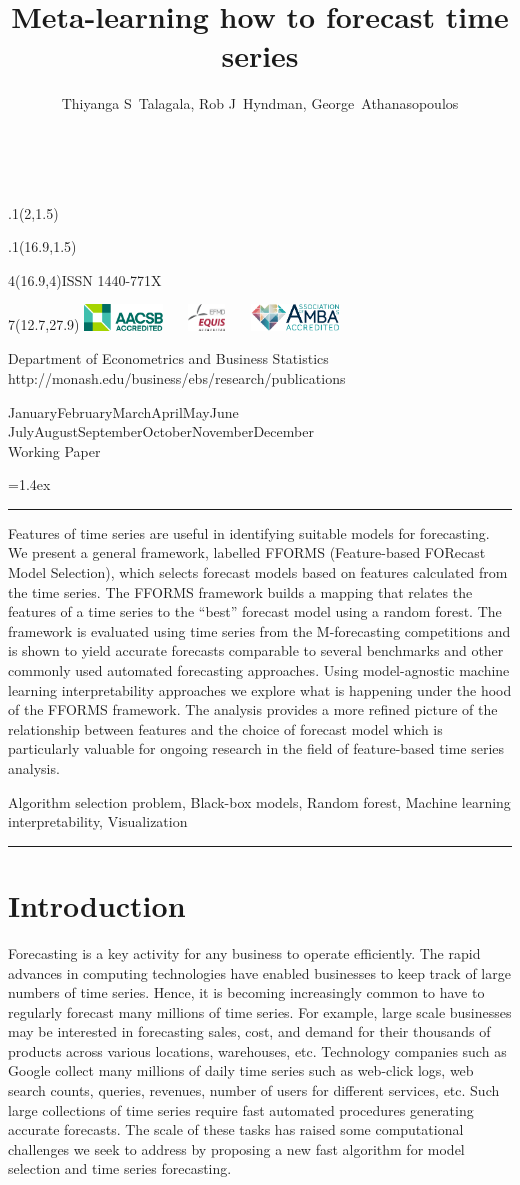 \documentclass[11pt,a4paper,]{article}
\title{Meta-learning how to forecast time series}
\author{Thiyanga S~Talagala, Rob J~Hyndman, George~Athanasopoulos}
\date{\sf\Date~\Month~\Year}
\makeatletter
\def\Date{\number\day}
\def\Month{\ifcase\month\or
 January\or February\or March\or April\or May\or June\or
 July\or August\or September\or October\or November\or December\fi}
\def\Year{\number\year}
\def\showjel{{\large\textsf{\textbf{JEL classification:}}~\@jel}}
\def\cover{{\sffamily\setcounter{page}{0}
        \thispagestyle{empty}
        \placefig{2}{1.5}{width=5cm}{monash2}
        \placefig{16.9}{1.5}{width=2.1cm}{MBusSchool}
        \begin{textblock}{4}(16.9,4)ISSN 1440-771X\end{textblock}
        \begin{textblock}{7}(12.7,27.9)\hfill
        \includegraphics[height=0.7cm]{AACSB}~~~
        \includegraphics[height=0.7cm]{EQUIS}~~~
        \includegraphics[height=0.7cm]{AMBA}
        \end{textblock}
        \vspace*{2cm}
        \begin{center}\Large
        Department of Econometrics and Business Statistics\\[.5cm]
        \footnotesize http://monash.edu/business/ebs/research/publications
        \end{center}\vspace{2cm}
        \begin{center}
        \fbox{\parbox{14cm}{\begin{onehalfspace}\centering\Huge\vspace*{0.3cm}
                \textsf{\textbf{\expandafter{\@title}}}\vspace{1cm}\par
                \LARGE\@author\end{onehalfspace}
        }}
        \end{center}
        \vfill
                \begin{center}\Large
                \Month~\Year\\[1cm]
                Working Paper \@wp
        \end{center}\vspace*{2cm}}}
\def\pageone{{\sffamily\setstretch{1}%
        \thispagestyle{empty}%
        \vbox to \textheight{%
        \raggedright\baselineskip=1.2cm
     {\fontsize{24.88}{30}\sffamily\textbf{\expandafter{\@title}}}
        \vspace{2cm}\par
        \hspace{1cm}\parbox{14cm}{\sffamily\large\@addresses}\vspace{1cm}\vfill
        \hspace{1cm}{\large\Date~\Month~\Year}\\[1cm]
        \hspace{1cm}\showjel\vss}}}
\def\blindtitle{{\sffamily
     \thispagestyle{plain}\raggedright\baselineskip=1.2cm
     {\fontsize{24.88}{30}\sffamily\textbf{\expandafter{\@title}}}\vspace{1cm}\par
        }}
\def\titlepage{{\cover\newpage\pageone\newpage\blindtitle}}
\let\maketitle\titlepage
\newenvironment{keywords}{\par\vspace{0.5cm}\noindent{\sffamily\textbf{Keywords:}}}{\vspace{0.25cm}\par\hrule\vspace{0.5cm}\par}
\renewenvironment{abstract}{\begin{minipage}{\textwidth}\parskip=1.4ex\noindent
\hrule\vspace{0.1cm}\par{\sffamily\textbf{\abstractname}}\newline}
  {\end{minipage}}
\def\placefig#1#2#3#4{\begin{textblock}{.1}(#1,#2)\rlap{\texttt{[image: \#4]}}\end{textblock}}
\makeatother
\begin{document}
\maketitle
\begin{abstract}
Features of time series are useful in identifying suitable models for forecasting. We present a general framework, labelled FFORMS (Feature-based FORecast Model Selection), which selects forecast models based on features calculated from the time series. The FFORMS framework builds a mapping that relates the features of a time series to the ``best'' forecast model using a random forest. The framework is evaluated using time series from the M-forecasting competitions and is shown to yield accurate forecasts comparable to several benchmarks and other commonly used automated forecasting approaches. Using model-agnostic machine learning interpretability approaches we explore what is happening under the hood of the FFORMS framework. The analysis provides a more refined picture of the relationship between features and the choice of forecast model which is particularly valuable for ongoing research in the field of feature-based time series analysis.
\end{abstract}
\begin{keywords}
Algorithm selection problem, Black-box models, Random forest, Machine learning interpretability, Visualization
\end{keywords}

\hypertarget{introduction}{%
\section{Introduction}\label{introduction}}

Forecasting is a key activity for any business to operate efficiently. The rapid advances in computing technologies have enabled businesses to keep track of large numbers of time series. Hence, it is becoming increasingly common to have to regularly forecast many millions of time series. For example, large scale businesses may be interested in forecasting sales, cost, and demand for their thousands of products across various locations, warehouses, etc. Technology companies such as Google collect many millions of daily time series such as web-click logs, web search counts, queries, revenues, number of users for different services, etc. Such large collections of time series require fast automated procedures generating accurate forecasts. The scale of these tasks has raised some computational challenges we seek to address by proposing a new fast algorithm for model selection and time series forecasting.
\end{document}

